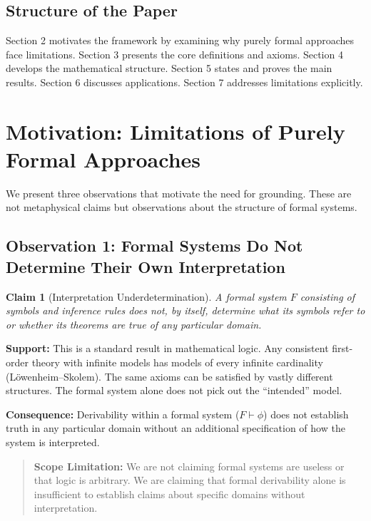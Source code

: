 \documentclass[12pt]{article}
\newtheorem{claim}{Claim}
\theoremstyle{definition}
\theoremstyle{remark}
\begin{document}
\subsection{Structure of the Paper}

Section 2 motivates the framework by examining why purely formal approaches face limitations.
Section 3 presents the core definitions and axioms. Section 4 develops the mathematical structure. Section 5 states and proves the main results. Section 6 discusses applications. Section 7
addresses limitations explicitly.

\section{Motivation: Limitations of Purely Formal Approaches}

We present three observations that motivate the need for grounding. These are not metaphysical
claims but observations about the structure of formal systems.

\subsection{Observation 1: Formal Systems Do Not Determine Their Own Interpretation}

\begin{claim}[Interpretation Underdetermination]\label{claim:interp}
A formal system $F$ consisting of symbols and
inference rules does not, by itself, determine what its symbols refer to or whether its theorems
are true of any particular domain.
\end{claim}

\textbf{Support:} This is a standard result in mathematical logic. Any consistent first-order theory
with infinite models has models of every infinite cardinality (L\"{o}wenheim--Skolem). The same
axioms can be satisfied by vastly different structures. The formal system alone does not pick
out the ``intended'' model.

\textbf{Consequence:} Derivability within a formal system ($F \vdash \phi$) does not establish truth in any
particular domain without an additional specification of how the system is interpreted.

\begin{quote}
\textbf{Scope Limitation:} We are not claiming formal systems are useless or that logic is arbitrary.
We are claiming that formal derivability alone is insufficient to establish claims about specific
domains without interpretation.
\end{quote}
\end{document}

